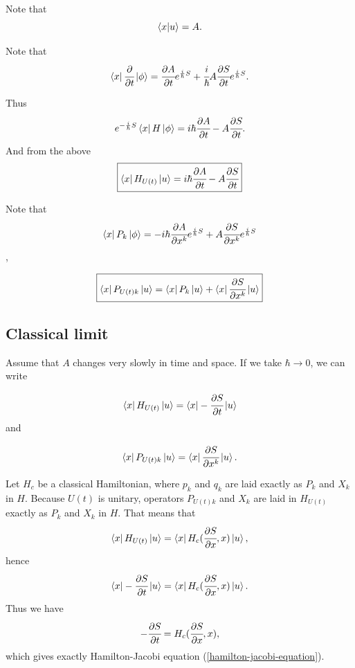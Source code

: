 \documentclass[main.tex]{subfiles}
\begin{document}
Note that
\begin{equation}
\bra{x}\ket{u} = A.
\end{equation}

Note that 
\begin{equation}
\bra{x} \cfrac{\partial}{\partial t} \ket{\phi} = \cfrac{\partial A}{\partial t} e^{\frac{i}{\hbar}S} + \cfrac{i}{\hbar} A\cfrac{\partial S}{\partial t}e^{\frac{i}{\hbar}S}.
\end{equation}

Thus 
\begin{equation}
e^{-\frac{i}{\hbar}S} \bra{x} H \ket{\phi} = i\hbar \cfrac{\partial A}{\partial t} - A \cfrac{\partial S}{\partial t}. 
\end{equation}
And from the above
\begin{equation}
\boxed{
\bra{x} H_{U(t)} \ket{u} = i\hbar \cfrac{\partial A}{\partial t} - A \cfrac{\partial S}{\partial t}}
\end{equation}

Note that
\begin{equation}
\bra{x}P_k\ket{\phi} = -i\hbar \cfrac{\partial A}{\partial x^k}e^{\frac{i}{\hbar}S}
+ A \cfrac{\partial S}{\partial x^k}e^{\frac{i}{\hbar}S}
\end{equation},

\begin{equation}
\boxed{
\bra{x}P_{U(t)k}\ket{u} = \bra{x}P_k\ket{u} + \bra{x} \cfrac{\partial S}{\partial x^k}\ket{u}}
\end{equation}
\subsection{Classical limit}

Assume that $A$ changes very slowly in time and space. If we take $\hbar \to 0$, we can write

\begin{equation}
\bra{x} H_{U(t)} \ket{u} = \bra{x} -\cfrac{\partial S}{\partial t} \ket{u}
\end{equation}
and

\begin{equation}
\bra{x} P_{U(t)k}\ket{u} = \bra{x} \cfrac{\partial S}{\partial x^k} \ket{u}.
\end{equation}

Let $H_c$ be a classical Hamiltonian, where $p_k$ and $q_k$ are laid exactly as $P_k$ and $X_k$ in $H$. Because $U(t)$ is unitary, operators $P_{U(t)k}$ and $X_k$ are laid in $H_{U(t)}$ exactly as $P_k$ and $X_k$ in $H$. That means that 
\begin{equation}
\bra{x} H_{U(t)} \ket{u} = \bra{x} H_c(\cfrac{\partial S}{\partial x}, x)\ket{u},
\end{equation}
hence
\begin{equation}
\bra{x}-\cfrac{\partial S}{\partial t} \ket{u} = \bra{x}H_c(\cfrac{\partial S}{\partial x}, x)\ket{u}.
\end{equation}
Thus we have 
\begin{equation}
-\cfrac{\partial S}{\partial t}  = H_c(\cfrac{\partial S}{\partial x}, x),
\end{equation}
which gives exactly Hamilton-Jacobi equation (\ref{hamilton-jacobi-equation}).
\end{document}
